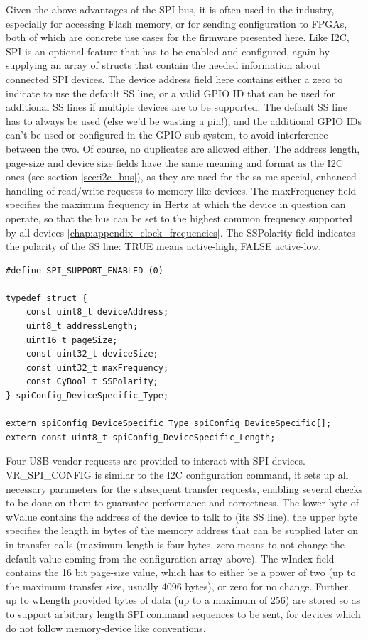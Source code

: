 \documentclass[a4paper,12pt]{report}
\begin{document}
Given the above advantages of the SPI bus, it is often used in the industry, especially for accessing Flash memory, or for sending configuration to FPGAs, both of which are concrete use cases for the firmware presented here. Like I2C, SPI is an optional feature that has to be enabled and configured, again by supplying an array of structs that contain the needed information about connected SPI devices. The device address field here contains either a zero to indicate to use the default SS line, or a valid GPIO ID that can be used for additional SS lines if multiple devices are to be supported. The default SS line has to always be used (else we'd be wasting a pin!), and the additional GPIO IDs can't be used or configured in the GPIO sub-system, to avoid interference between the two. Of course, no duplicates are allowed either. The address length, page-size and device size fields have the same meaning and format as the I2C ones (see section \ref{sec:i2c_bus}), as they are used for the sa
 me special, enhanced handling of read/write requests to memory-like devices. The maxFrequency field specifies the maximum frequency in Hertz at which the device in question can operate, so that the bus can be set to the highest common frequency supported by all devices \ref{chap:appendix_clock_frequencies}. The SSPolarity field indicates the polarity of the SS line: TRUE means active-high, FALSE active-low.

\begin{lstlisting}
#define SPI_SUPPORT_ENABLED (0)

typedef struct {
    const uint8_t deviceAddress;
    uint8_t addressLength;
    uint16_t pageSize;
    const uint32_t deviceSize;
    const uint32_t maxFrequency;
    const CyBool_t SSPolarity;
} spiConfig_DeviceSpecific_Type;

extern spiConfig_DeviceSpecific_Type spiConfig_DeviceSpecific[];
extern const uint8_t spiConfig_DeviceSpecific_Length;
\end{lstlisting}

Four USB vendor requests are provided to interact with SPI devices.
VR\_SPI\_CONFIG is similar to the I2C configuration command, it sets up all necessary parameters for the subsequent transfer requests, enabling several checks to be done on them to guarantee performance and correctness. The lower byte of wValue contains the address of the device to talk to (its SS line), the upper byte specifies the  length in bytes of the memory address that can be supplied later on in transfer calls (maximum length is four bytes, zero means to not change the default value coming from the configuration array above). The wIndex field contains the 16 bit page-size value, which has to either be a power of two (up to the maximum transfer size, usually 4096 bytes), or zero for no change. Further, up to wLength provided bytes of data (up to a maximum of 256) are stored so as to support arbitrary length SPI command sequences to be sent, for devices which do not follow memory-device like conventions.
\end{document}
